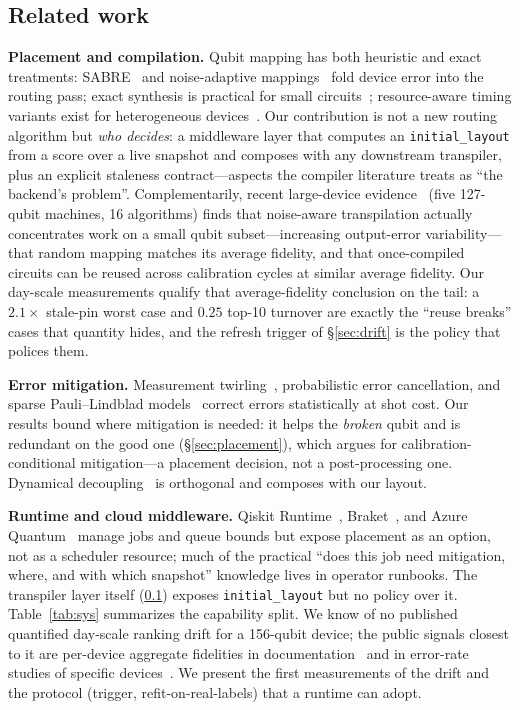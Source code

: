 \documentclass[journal,10pt,twocolumn]{IEEEtran}
\begin{document}
\subsection{Related work}
\label{sec:related2}
\textbf{Placement and compilation.} Qubit mapping has both heuristic and exact treatments: SABRE~\cite{li2019sabre}
and noise-adaptive mappings~\cite{murali2019noise} fold device error into the routing pass; exact synthesis is
practical for small circuits~\cite{tan2020iccado}; resource-aware timing variants exist for heterogeneous
devices~\cite{lao2022timing}. Our contribution is not a new routing algorithm but \emph{who decides}: a middleware
layer that computes an \texttt{initial\_layout} from a score over a live snapshot and composes with any downstream
transpiler, plus an explicit staleness contract---aspects the compiler literature treats as ``the backend's
problem''. Complementarily, recent large-device evidence~\cite{huowei2025} (five 127-qubit machines, 16 algorithms)
finds that noise-aware transpilation actually concentrates work on a small qubit subset---increasing output-error
variability---that random mapping matches its average fidelity, and that once-compiled circuits can be reused across
calibration cycles at similar average fidelity. Our day-scale measurements qualify that average-fidelity conclusion
on the tail: a $2.1\times$ stale-pin worst case and $0.25$ top-10 turnover are exactly the ``reuse breaks'' cases
that quantity hides, and the refresh trigger of \S\ref{sec:drift} is the policy that polices them.

\textbf{Error mitigation.} Measurement twirling~\cite{nation2023,bravyi2021meas}, probabilistic error cancellation,
and sparse Pauli--Lindblad models~\cite{vanberg2023,temme2017} correct errors statistically at shot cost. Our results
bound where mitigation is needed: it helps the \emph{broken} qubit and is redundant on the good one
(\S\ref{sec:placement}), which argues for calibration-conditional mitigation---a placement decision, not a
post-processing one. Dynamical decoupling~\cite{viola1999dd} is orthogonal and composes with our layout.

\textbf{Runtime and cloud middleware.} Qiskit Runtime~\cite{ibmrtime}, Braket~\cite{braket}, and Azure
Quantum~\cite{azureq} manage jobs and queue bounds but expose placement as an option, not as a scheduler resource;
much of the practical ``does this job need mitigation, where, and with which snapshot'' knowledge lives in operator
runbooks. The transpiler layer itself (\ref{sec:related2}) exposes \texttt{initial\_layout} but no policy over it.
Table~\ref{tab:sys} summarizes the capability split. We know of no published quantified day-scale ranking drift for a
156-qubit device; the public signals closest to it are per-device aggregate fidelities in
documentation~\cite{ibmcalib} and in error-rate studies of specific devices~\cite{kim2023utility}. We present the
first measurements of the drift and the protocol (trigger, refit-on-real-labels) that a runtime can adopt.
\end{document}
